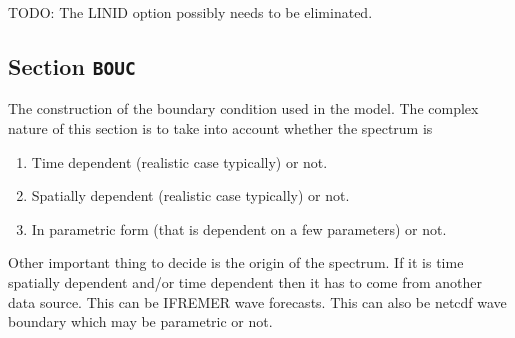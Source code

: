 \documentclass[12pt]{amsart}
\begin{document}
TODO: The LINID option possibly needs to be eliminated.





\subsection{Section {\tt BOUC}}
The construction of the boundary condition used in the model. The complex nature of this section is to take into account whether the spectrum is
\begin{enumerate}
\item Time dependent (realistic case typically) or not.
\item Spatially dependent (realistic case typically) or not.
\item In parametric form (that is dependent on a few parameters) or not.
\end{enumerate}
Other important thing to decide is the origin of the spectrum. If it is time spatially dependent and/or time dependent then it has to come from another data source. This can be IFREMER wave forecasts. This can also be netcdf wave boundary which may be parametric or not.
\end{document}
